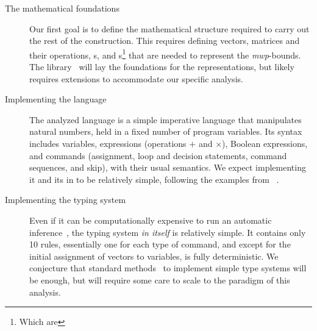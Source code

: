\begin{description}

\item[The mathematical foundations]
Our first goal is to define the mathematical structure required to carry out the
rest of the construction. This requires defining vectors, matrices and their
operations, s, and s\footnote{Which are
} that are needed to represent the
\emph{mwp}-bounds. The 
library~\cite{mahboubi2022,mathcomp} will lay the foundations for the
 representations, but likely requires extensions to
accommodate our specific analysis.

\item[Implementing the language]
The analyzed language is a simple imperative language that manipulates natural
numbers, held in a fixed number of program variables. Its syntax includes
variables, expressions (operations \(+\) and \(\times\)), Boolean expressions,
and commands (\eg  assignment, loop and decision statements, command sequences,
and skip), with their usual semantics. We expect implementing it and its
 in  to be relatively simple, following the
examples from ~\cite{cpierce20221,cpierce20222}.

\item[Implementing the typing system]
Even if it can be computationally expensive to run an automatic
inference~\cite{aubert2023b}, the typing system \emph{in
itself} is relatively simple. It contains only 10 rules, essentially one for
each type of command, and except for the initial assignment of vectors to
variables, is fully deterministic. We conjecture that standard
methods~\cite{chlipala2022, chlipala2010} to implement simple type systems will
be enough, but will require some care to scale to the 
paradigm of this analysis.


\end{description}
